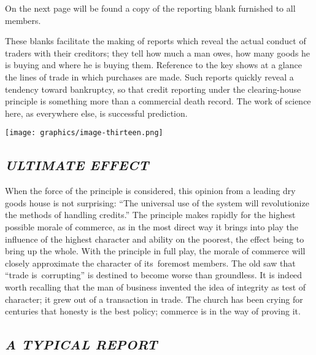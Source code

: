 \documentclass[twoside,symmetric,nobib,justified]{tufte-book}
\begin{document}
On the next page will be found a copy of the reporting blank furnished
to all members.~

These blanks facilitate the making of reports which reveal the actual
conduct of traders with their creditors; they tell how much a man owes,
how many goods he is buying and where he is buying them. Reference to
the key shows at a glance the lines of trade in which purchases are
made. Such reports quickly reveal a tendency toward bankruptcy, so that
credit reporting under the clearing-house principle is something more
than a commercial death record. The work of science here, as everywhere
else, is successful prediction.~

\begin{figure*}  
   \texttt{[image: graphics/image-thirteen.png]} %
   \label{fig:fig13}
\end{figure*}

\hypertarget{ultimate-effect}{%
\subsection{\texorpdfstring{\emph{ULTIMATE
EFFECT}}{ULTIMATE EFFECT}}\label{ultimate-effect}}

When the force of the principle is considered, this opinion from a
leading dry goods house is not surprising: ``The universal use of the
system will revolutionize the methods of handling credits.'' The
principle makes rapidly for the highest possible morale of commerce, as
in the most direct way it brings into play the influence of the highest
character and ability on the poorest, the effect being to bring up the
whole. With the principle in full play, the morale of commerce will
closely approximate the character of its~foremost members. The old saw
that ``trade is~corrupting'' is destined to become worse than
groundless. It is indeed worth recalling that the man of business
invented the idea of integrity as test of character; it grew out of a
transaction in trade. The church has been crying for centuries that
honesty is the best policy; commerce is in the way of proving it.~~



\hypertarget{a-typical-report}{%
\subsection{\texorpdfstring{\emph{A TYPICAL
REPORT}}{A TYPICAL REPORT}}\label{a-typical-report}}
\end{document}
